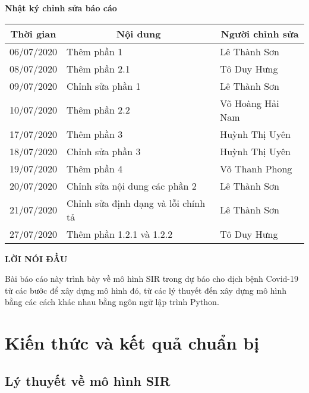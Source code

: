 \documentclass[a4paper]{article}
\begin{document}
\vspace{0.5cm}
\textbf{\large Nhật ký chỉnh sửa báo cáo}
\vspace{0.5cm}
\begin{table}[!h]
    \centering
    \begin{tabular}{|p{3cm}|p{6cm}|p{4cm}|}
        \hline
        \multicolumn{1}{|c|}{Thời gian } & \multicolumn{1}{c|}{Nội dung} & \multicolumn{1}{c|}{Người chỉnh sửa}\\
         \hline
         06/07/2020 &  Thêm phần 1 & Lê Thành Sơn\\ 
         \hline
         08/07/2020 &  Thêm phần 2.1 & Tô Duy Hưng\\
         \hline
         09/07/2020 &  Chỉnh sửa phần 1 & Lê Thành Sơn\\
         \hline
         10/07/2020 & Thêm phần 2.2 & Võ Hoàng Hải Nam\\
         \hline 
         17/07/2020 & Thêm phần 3 & Huỳnh Thị Uyên\\
         \hline 
         18/07/2020 & Chỉnh sửa phần 3 & Huỳnh Thị Uyên\\
         \hline 
         19/07/2020 & Thêm phần 4 & Võ Thanh Phong\\
         \hline
         20/07/2020 & Chỉnh sửa nội dung các phần 2 & Lê Thành Sơn \\
         \hline
         21/07/2020 & Chỉnh sửa định dạng và lỗi chính tả & Lê Thành Sơn\\
         \hline
         27/07/2020 & Thêm phần 1.2.1 và 1.2.2 & Tô Duy Hưng\\
         \hline
    \end{tabular}
\end{table}

\newpage
\tableofcontents
\newpage
\listoffigures
\newpage 

\textbf{LỜI NÓI ĐẦU}

Bài báo cáo này trình bày về mô hình SIR trong dự báo cho dịch bệnh Covid-19 từ các bước để xây dựng mô hình đó, từ các lý thuyết đến xây dựng mô hình bằng các cách khác nhau bằng ngôn ngữ lập trình Python. 

\section{Kiến thức và kết quả chuẩn bị}\label{chuan_bi}

\subsection{Lý thuyết về mô hình SIR}\label{SIR}
\end{document}
